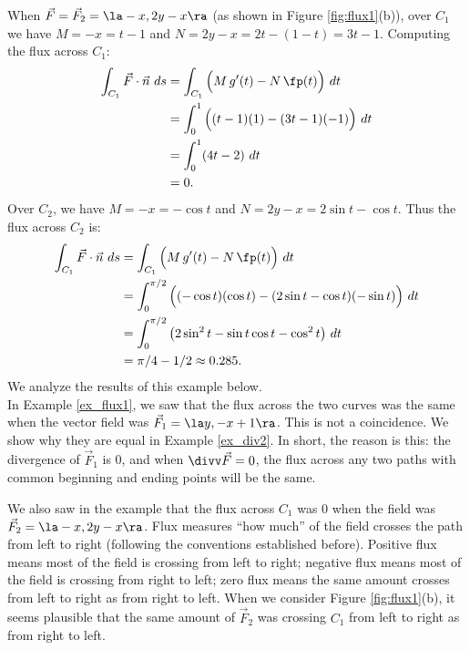 {When $\vec F = \vec F_2 = \la -x,2y-x\ra$ (as shown in Figure \ref{fig:flux1}(b)), over $C_1$ we have $M = -x = t-1$ and $N = 2y-x = 2t-(1-t) = 3t-1$. Computing the flux across $C_1$:
\begin{align*}
\int_{C_1} \vec F\cdot \vec n\ ds & = \int_{C_1} \Big(M\,g'(t) - N\,\fp(t)\Big)\ dt\\
			&= \int_0^1 \Big( (t-1)(1) - (3t-1)(-1)\Big)\ dt \\
			&= \int_0^1 (4t-2)\ dt\\
			&= 0.
\end{align*}
Over $C_2$, we have $M = -x = -\cos t$ and $N = 2y-x = 2\sin t-\cos t$. Thus the flux across $C_2$ is:
\begin{align*}
\int_{C_1} \vec F\cdot \vec n\ ds & = \int_{C_1} \Big(M\,g'(t) - N\,\fp(t)\Big)\ dt\\
				&= \int_0^{\pi/2}\Big((-\cos t)(\cos t) - (2\sin t-\cos t)(-\sin t)\Big)\ dt\\
				&= \int_0^{\pi/2} \big(2\sin^2 t-\sin t\cos t-\cos^2t\big)\ dt\\
				&=\pi/4 - 1/2\approx 0.285.
\end{align*}
We analyze the results of this example below.
}\\

In Example \ref{ex_flux1}, we saw that the flux across the two curves was the same when the vector field was $\vec F_1 = \la y, -x+1\ra$. This is not a coincidence. We show why they are equal in Example \ref{ex_div2}. In short, the reason is this: the divergence of $\vec F_1$ is 0, and when $\divv \vec F = 0$, the flux across any two paths with common beginning and ending points will be the same.

We also saw in the example that the flux across $C_1$ was 0 when the field was $\vec F_2 = \la -x, 2y-x\ra$. Flux measures ``how much'' of the field crosses the path from left to right (following the conventions established before). Positive flux means most of the field is crossing from left to right; negative flux means most of the field is crossing from right to left; zero flux means the same amount crosses from left to right as from right to left. When we consider Figure \ref{fig:flux1}(b), it seems plausible that the same amount of $\vec F_2$ was crossing $C_1$ from left to right as from right to left.

%

